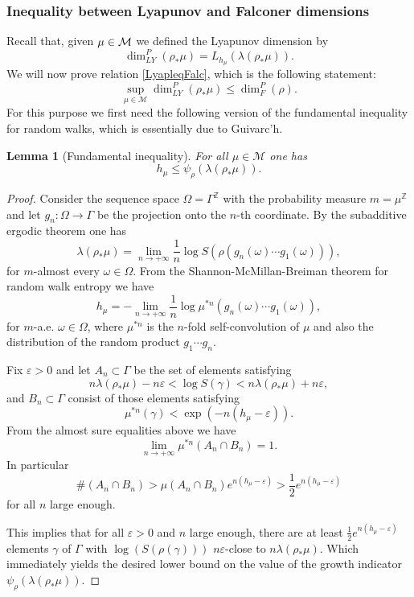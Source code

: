 \documentclass[JEP,XML,SOM,Unicode,NoEqCountersInSection,published]{cedram}
\let\epsilon\varepsilon
\newtheorem{lemma}[theorem]{Lemma}
\newcommand{\Z}{\mathbb{Z}}
\let\e\varepsilon
\let\G\Gamma
\let\g\gamma
\begin{document}
\subsubsection{Inequality between Lyapunov and Falconer dimensions\label{proofLyap}}

Recall that, given \(\mu \in\nobreak \mathcal{M}\) we defined the Lyapunov dimension by
\[
\dim_{LY}^P(\rho_\ast \mu) = L_{h_\mu}(\lambda(\rho_*\mu)).
\]
We will now prove relation \eqref{LyapleqFalc}, which is the following statement:
\[
\sup_{\mu \in \mathcal{M}}\dim_{LY}^P(\rho_\ast \mu) \le \dim_F^P(\rho).
\]
For this purpose we first need the following version of the fundamental inequality for random walks, which is essentially due to Guivarc'h.

\begin{lemma}[Fundamental inequality]
For all \(\mu \in \mathcal{M}\) one has
\[
h_\mu \le \psi_{\rho}(\lambda(\rho_*\mu)).
\]
\end{lemma}
\begin{proof}
Consider the sequence space \(\Omega = \Gamma^{\Z}\) with the probability measure \(m = \mu^\Z\) and let \(g_n:\Omega \to \Gamma\) be the projection onto the \(n\)-th coordinate.
By the subadditive ergodic theorem \cite{Ose68} one has
\[
\lambda(\rho_*\mu) = \lim_{n \to +\infty}\frac{1}{n}\log S(\rho(g_n(\omega)\cdots g_1(\omega))),
\]
for \(m\)-almost every \(\omega \in \Omega\).
From the Shannon-McMillan-Breiman theorem for random walk entropy \cite{KV83} we have
\[
h_\mu = -\lim_{n \to +\infty}\frac{1}{n}\log \mu^{\ast n}(g_n(\omega)\cdots g_1(\omega)),
\]
for \(m\)-a.e. \(\omega \in \Omega\), where \(\mu^{\ast n}\) is the \(n\)-fold self-convolution of \(\mu\) and also the distribution of the random product \(g_1 \cdots g_n\).

Fix \(\epsilon > 0\) and let \(A_n \subset \Gamma\) be the set of elements satisfying
\[
n\lambda(\rho_*\mu) - n\epsilon < \log S(\gamma) < n\lambda(\rho_*\mu) + n\epsilon,
\]
and \(B_n \subset \Gamma\) consist of those elements satisfying
\[
\mu^{\ast n}(\gamma) < \exp(-n(h_\mu - \epsilon)).
\]
From the almost sure equalities above we have
\[
\lim_{n \to +\infty}\mu^{\ast n}(A_n \cap B_n) = 1.
\]
In particular
\[
\# (A_n \cap B_n) > \mu(A_n \cap B_n)e^{n(h_\mu - \epsilon)} > \frac{1}{2}e^{n(h_\mu - \epsilon)}
\]
for all \(n\) large enough.

This implies that for all \(\epsilon >0\) and \(n\) large enough, there are at least \(\frac{1}{2}e^{n(h_\mu -\e)}\) elements \(\g\) of \(\G\) with \(\log(S(\rho(\gamma)))\) \(n \e\)-close to \(n\lambda (\rho_*\mu)\). Which immediately yields the desired lower bound on the value of the growth indicator \(\psi_{\rho}(\lambda(\rho_*\mu))\).
\end{proof}
\end{document}
